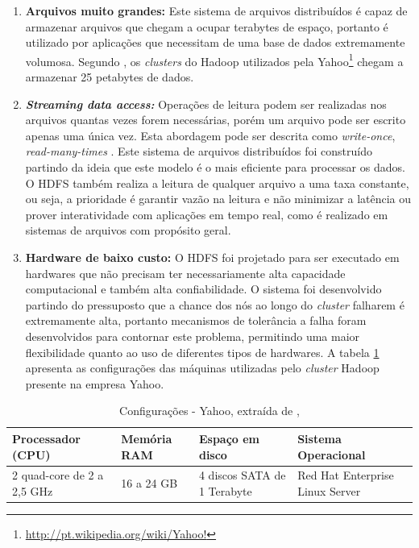 \begin{enumerate}

\item \textbf{Arquivos muito grandes:} Este sistema de arquivos distribuídos é capaz de armazenar arquivos que chegam a ocupar terabytes de espaço, portanto é utilizado por aplicações que necessitam de uma base de dados extremamente volumosa. Segundo , os \textit{clusters} do Hadoop utilizados pela Yahoo\footnote{\url{http://pt.wikipedia.org/wiki/Yahoo!}} chegam a armazenar 25 petabytes de dados.

\item \textit{\textbf{Streaming data access:}} Operações de leitura podem ser realizadas nos arquivos quantas vezes forem necessárias, porém um arquivo pode ser escrito apenas uma única vez. Esta abordagem pode ser descrita como \textit{write-once}, \textit{read-many-times} \cite{white2012}. Este sistema de arquivos distribuídos foi construído partindo da ideia que este modelo é o mais eficiente para processar os dados. O HDFS também realiza a leitura de qualquer arquivo a uma taxa constante, ou seja, a prioridade é garantir vazão na leitura e não minimizar a latência ou prover interatividade com aplicações em tempo real, como é realizado em sistemas de arquivos com propósito geral.

\item \textbf{Hardware de baixo custo:} O HDFS foi projetado para ser executado em hardwares que não precisam ter necessariamente alta capacidade computacional e também alta confiabilidade. O sistema foi desenvolvido partindo do pressuposto que a chance dos nós ao longo do \textit{cluster} falharem é extremamente alta, portanto mecanismos de tolerância a falha foram desenvolvidos para contornar este problema, permitindo uma maior flexibilidade quanto ao uso de diferentes tipos de hardwares. A tabela \ref{tab-hardware} apresenta as configurações das máquinas utilizadas pelo \textit{cluster} Hadoop presente na empresa Yahoo.

\end{enumerate}

\begin{table}[!ht]
\begin{center}
  \begin{tabular}{|p{3cm}|p{2cm}|p{3cm}|p{4cm}|}
	\hline
	Processador (CPU) & Memória RAM  & Espaço em disco & Sistema Operacional
	\\ \hline
	2 quad-core de 2 a 2,5 GHz & 16 a 24 GB & 4 discos SATA de 1 Terabyte & Red Hat Enterprise Linux Server
	\\ \hline
  \end{tabular}
  \caption{Configurações - Yahoo, extraída de 
  , }
\label{tab-hardware}
\end{center}
\end{table}
\FloatBarrier

